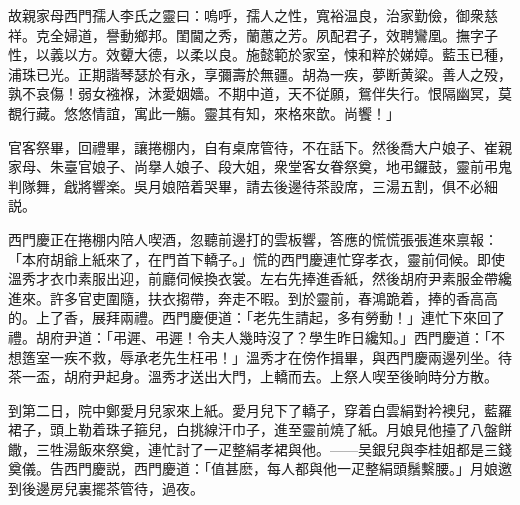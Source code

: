 故親家母西門孺人李氏之靈曰：嗚呼，孺人之性，寬裕温良，治家勤儉，御衆慈祥。克全婦道，譽動鄉邦。閨閫之秀，蘭蕙之芳。夙配君子，效聘鸞凰。撫字子性，以義以方。效顰大德，以柔以良。施懿範於家室，悚和粹於娣嫜。藍玉已種，浦珠已光。正期諧琴瑟於有永，享彌壽於無疆。胡為一疾，夢断黄粱。善人之殁，孰不哀傷！弱女襁褓，沐愛姻嬙。不期中道，天不従願，鴛伴失行。恨隔幽冥，莫覩行藏。悠悠情誼，寓此一觴。靈其有知，來格來歆。尚饗！」

官客祭畢，回禮畢，讓捲棚内，自有桌席管待，不在話下。然後喬大户娘子、崔親家母、朱臺官娘子、尚擧人娘子、段大姐，衆堂客女眷祭奠，地弔鑼鼓，靈前弔鬼判隊舞，戧將響楽。吳月娘陪着哭畢，請去後邊待茶設席，三湯五割，俱不必細説。

西門慶正在捲棚内陪人喫酒，忽聽前邊打的雲板響，答應的慌慌張張進來禀報：「本府胡爺上紙來了，在門首下轎子。」慌的西門慶連忙穿孝衣，靈前伺候。即使溫秀才衣巾素服出迎，前廳伺候換衣裳。左右先捧進香紙，然後胡府尹素服金帶纔進來。許多官吏圍隨，扶衣搊帶，奔走不暇。到於靈前，春鴻跪着，捧的香高高的。上了香，展拜兩禮。西門慶便道：「老先生請起，多有勞動！」連忙下來回了禮。胡府尹道：「弔遲、弔遲！令夫人幾時沒了？學生昨日纔知。」西門慶道：「不想簉室一疾不救，辱承老先生枉弔！」溫秀才在傍作揖畢，與西門慶兩邊列坐。待茶一盃，胡府尹起身。溫秀才送出大門，上轎而去。上祭人喫至後晌時分方散。

到第二日，院中鄭愛月兒家來上紙。愛月兒下了轎子，穿着白雲絹對衿襖兒，藍羅裙子，頭上勒着珠子箍兒，白挑線汗巾子，進至靈前燒了紙。月娘見他擡了八盤餅饊，三牲湯飯來祭奠，連忙討了一疋整絹孝裙與他。——吴銀兒與李桂姐都是三錢奠儀。告西門慶説，西門慶道：「值甚麽，每人都與他一疋整絹頭鬚繫腰。」月娘邀到後邊房兒裏擺茶管待，過夜。

